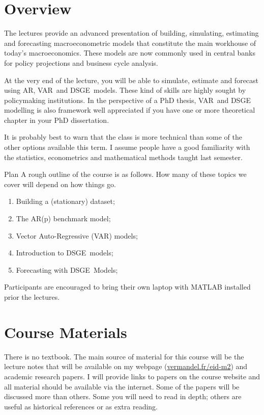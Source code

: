 \documentclass[a4paper,12pt]{article}%
\begin{document}
\FRONTPAGE


\section{Overview}

The lectures provide an advanced presentation of building, simulating,
estimating and forecasting macroeconometric models that constitute the main
workhouse of today's macroeconomics. These models are now commonly used in
central banks for policy projections and business cycle analysis.

At the very end of the lecture, you will be able to simulate, estimate and
forecast using AR, VAR\ and DSGE\ models. These kind of skills are highly
sought by policymaking institutions. In the perspective of a PhD thesis,
VAR\ and DSGE modelling is also framework well appreciated if you have one or
more theoretical chapter in your PhD dissertation.

It is probably best to warn that the class is more technical than some of the
other options available this term. I assume people have a good familiarity
with the statistics, econometrics and mathematical methods taught last semester.

\vspace{4ex} \begin{mybox}{Plan}
A rough outline of the course is as follows. How many of these topics we cover
will depend on how things go.
\begin{enumerate}
\item Building a (stationary) dataset;
\item The AR(p) benchmark model;
\item Vector Auto-Regressive (VAR) models;
\item Introduction to DSGE\ models;
\item Forecasting with DSGE\ Models;
\end{enumerate}
\end{mybox}\vspace{3ex}

Participants are encouraged to bring their own laptop with MATLAB installed
prior the lectures.

\section{Course Materials}

There is no textbook. The main source of material for this course will be the
lecture notes that will be available on my webpage
(\href{http://vermandel.fr/eid-m2/}{vermandel.fr/eid-m2}) and academic
research papers. I will provide links to papers on the course website and all
material should be available via the internet. Some of the papers will be
discussed more than others. Some you will need to read in depth; others are
useful as historical references or as extra reading.
\end{document}
